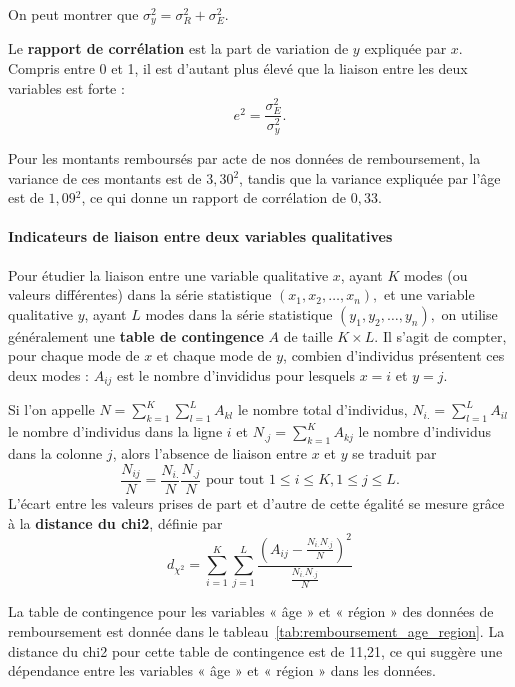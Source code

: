 On peut montrer que $\sigma_y^2 = \sigma_R^2 + \sigma_E^2.$

Le \textbf{rapport de corrélation} est la part de variation de $y$ expliquée
par $x$. Compris entre 0 et 1, il est d'autant plus élevé que la liaison entre
les deux variables est forte :
\[
e^2  = \frac{\sigma_E^2}{\sigma_y^2}.
\]
\begin{exemple}
  Pour les montants remboursés par acte de nos données de remboursement, la
  variance de ces montants est de $3,30$\texteuro$^2$, tandis que la variance
  expliquée par l'âge est de $1,09$\texteuro$^2$, ce qui donne un rapport de
  corrélation de $0,33.$ 
\end{exemple}

\paragraph{Indicateurs de liaison entre deux variables qualitatives}
Pour étudier la liaison entre une variable qualitative $x$, ayant $K$ modes (ou
valeurs différentes) dans la série statistique $(x_1, x_2, \dots, x_n),$ et une
variable qualitative $y$, ayant $L$ modes dans la série statistique
$(y_1, y_2, \dots, y_n),$ on utilise généralement une \textbf{table de
  contingence} $A$ de taille $K \times L.$ Il s'agit de compter, pour chaque
mode de $x$ et chaque mode de $y$, combien d'individus présentent ces deux
modes : $A_{ij}$ est le nombre d'invididus pour lesquels $x = i$ et $y = j$.

Si l'on appelle $N = \sum_{k=1}^K \sum_{l=1}^L A_{kl}$ le nombre total
d'individus, $N_{i.} = \sum_{l=1}^L A_{il}$ le nombre d'individus dans la ligne
$i$ et $N_{.j} = \sum_{k=1}^K A_{kj}$ le nombre d'individus dans la colonne $j$,
alors l'absence de liaison entre $x$ et $y$ se traduit par 
\[
  \frac{N_{ij}}{N} = \frac{N_{i.}}{N}
  \frac{N_{.j}}{N} \text{ pour tout } 
  1 \leq i \leq K, 1 \leq j \leq L.
\]
L'écart entre les valeurs prises de part et d'autre de cette égalité se mesure
grâce à la \textbf{distance du chi2}, définie par 
\[
d_{\chi^2} = \sum_{i=1}^K \sum_{j=1}^L  \frac{\left( A_{ij} - 
    \frac{N_{i.}N_{.j}}{N} \right)^2}{\frac{N_{i.}N_{.j}}{N}}
\]

\begin{exemple}
  La table de contingence pour les variables « âge » et « région » des données
  de remboursement est donnée dans le
  tableau~\ref{tab:remboursement_age_region}. La distance du chi2 pour cette
  table de contingence est de 11,21, ce qui suggère une dépendance entre les
  variables « âge » et « région » dans les données.
\end{exemple}


